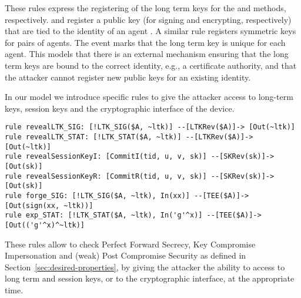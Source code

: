 These rules express the registering of the long term keys for the \mSig{} and
\mStat{} methods, respectively.
%
 and  register a public key (for
signing and encrypting, respectively) that are tied to the identity of an agent
. A similar rule  registers symmetric keys for pairs
of agents.
%
The event  marks that the long term key is unique for each
agent.
This models that there is an external mechanism ensuring that the
long term keys are bound to the correct identity, e.g., a certificate authority,
and that the attacker cannot register new public keys for an existing identity.

In our model we introduce specific rules to give the attacker access to
long-term keys, session keys and the cryptographic interface of the device.
\begin{lstlisting}
rule revealLTK_SIG: [!LTK_SIG($A, ~ltk)] --[LTKRev($A)]-> [Out(~ltk)]
rule revealLTK_STAT: [!LTK_STAT($A, ~ltk)] --[LTKRev($A)]-> [Out(~ltk)]
rule revealSessionKeyI: [CommitI(tid, u, v, sk)] --[SKRev(sk)]-> [Out(sk)]
rule revealSessionKeyR: [CommitR(tid, u, v, sk)] --[SKRev(sk)]-> [Out(sk)]
rule forge_SIG: [!LTK_SIG($A, ~ltk), In(xx)] --[TEE($A)]-> [Out(sign(xx, ~ltk))]
rule exp_STAT: [!LTK_STAT($A, ~ltk), In('g'^x)] --[TEE($A)]-> [Out(('g'^x)^~ltk)]
\end{lstlisting}
These rules allow to check Perfect Forward Secrecy, Key Compromise Impersonation
and (weak) Post Compromise Security as defined in Section~\ref{sec:desired-properties},
by giving the attacker the ability to access to long term and session keys, or
to the cryptographic interface, at the appropriate time.



